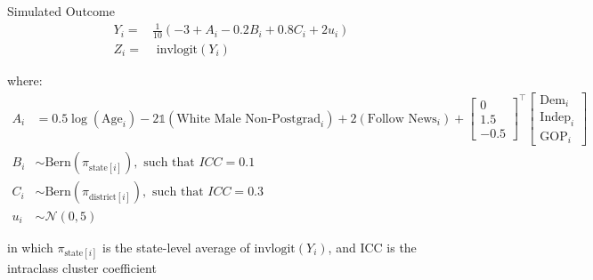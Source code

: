 \documentclass[ignorenonframetext, 10pt, aspectratio=169]{beamer}
\begin{document}
\begin{frame}
{Simulated Outcome}
\begin{align*}
Y_i =& \frac{1}{10}(-3 + A_i -0.2 B_i + 0.8 C_i + 2u_i)\\
Z_i =& \text{ invlogit}(Y_i)
\end{align*}

where:
\begin{align*}
A_i &= 0.5\log(\text{Age}_i) -2\mathds{1}(\text{White Male Non-Postgrad}_i) + 2(\text{Follow News}_i) + \begin{bmatrix}0\\1.5\\-0.5\end{bmatrix}^\top\begin{bmatrix}\text{Dem}_{i}\\\text{Indep}_i\\\text{GOP}_i\end{bmatrix}\\
B_i &\sim \text{Bern}(\pi_{\text{state}[i]}), \text{ such that }  ICC = 0.1\\
C_i &\sim \text{Bern}(\pi_{\text{district}[i]}), \text{ such that }  ICC = 0.3\\
u_i &\sim \mathcal{N}(0, 5)
\end{align*}

\normalsize
in which \(\pi_{\text{state}[i]}\) is the state-level average of \(\text{invlogit}(Y_i)\), and ICC is the intraclass cluster coefficient


\end{frame}
\end{document}
